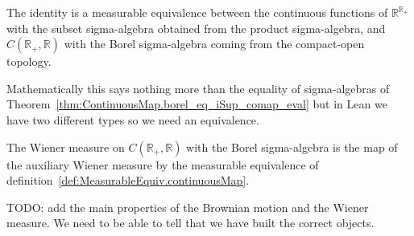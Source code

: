 \begin{definition}\label{def:MeasurableEquiv.continuousMap}
  \leanok
The identity is a measurable equivalence between the continuous functions of $\mathbb{R}^{\mathbb{R}_+}$ with the subset sigma-algebra obtained from the product sigma-algebra, and $C(\mathbb{R}_+, \mathbb{R})$ with the Borel sigma-algebra coming from the compact-open topology.

Mathematically this says nothing more than the equality of sigma-algebras of Theorem~\ref{thm:ContinuousMap.borel_eq_iSup_comap_eval} but in Lean we have two different types so we need an equivalence.
\end{definition}


\begin{definition}\label{def:wienerMeasure}
  \leanok
The Wiener measure on $C(\mathbb{R}_+, \mathbb{R})$ with the Borel sigma-algebra is the map of the auxiliary Wiener measure by the measurable equivalence of definition~\ref{def:MeasurableEquiv.continuousMap}.
\end{definition}


TODO: add the main properties of the Brownian motion and the Wiener measure.
We need to be able to tell that we have built the correct objects.
